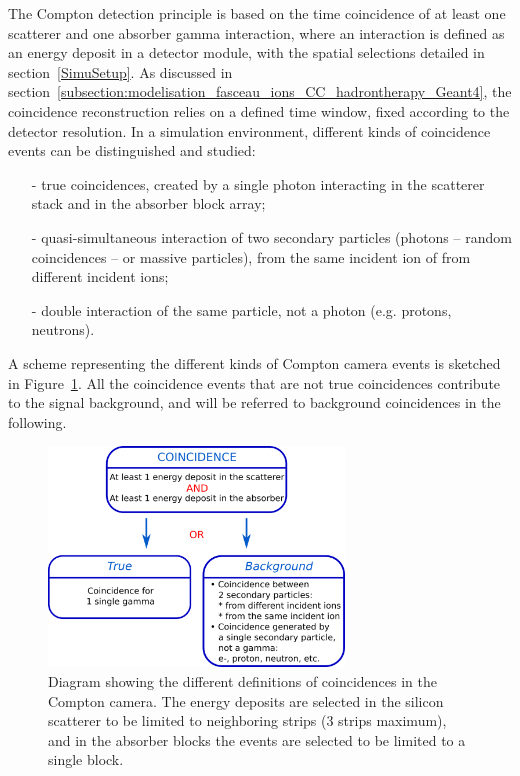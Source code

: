 The Compton detection principle is based on the time coincidence of at least one scatterer and one absorber gamma interaction, where an interaction is defined as an energy deposit in a detector module, with the spatial selections detailed in section~\ref{SimuSetup}. As discussed in section~\ref{subsection:modelisation_fasceau_ions_CC_hadrontherapy_Geant4}, the coincidence reconstruction relies on a defined time window, fixed according to the detector resolution. In a simulation environment, different kinds of coincidence events can be distinguished and studied: 
\begin{itemize}
\item[-] true coincidences, created by a single photon interacting in the scatterer stack and in the absorber block array;
\item[-] quasi-simultaneous interaction of two secondary particles (photons -- random coincidences -- or massive particles), from the same incident ion of from different incident ions;
\item[-] double interaction of the same particle, not a photon (e.g. protons, neutrons).
\end{itemize}
A scheme representing the different kinds of Compton camera events is sketched in Figure~\ref{fig::coincidence_CC_simulation_Hadronth}.
All the coincidence events that are not true coincidences contribute to the signal background, and will be referred to background coincidences in the following.
\begin{figure}
  \centering
  \includegraphics[width=0.7\textwidth]{./Figure/coinc_scheme.png}
  \caption{Diagram showing the different definitions of coincidences in the Compton camera. The energy deposits are selected in the silicon scatterer to be limited to neighboring strips (3 strips maximum), and in the absorber blocks the events are selected to be limited to a single block.}
 \label{fig::coincidence_CC_simulation_Hadronth}
\end{figure}

